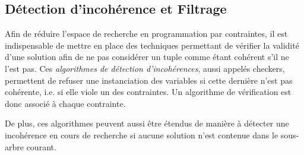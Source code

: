 \subsection{Détection d'incohérence et Filtrage}
\label{sec:PPC_propag}

Afin de réduire l'espace de recherche en programmation par contraintes,
il est indispensable de mettre en place des techniques permettant de
vérifier la validité d'une solution afin de ne pas considérer un tuple
comme étant cohérent s'il ne l'est pas. Ces {\it algorithmes de
détection d'incohérences}, aussi appelés checkers, permettent de
refuser une instanciation des variables si cette dernière n'est pas
cohérente, i.e. si elle viole un des contraintes. Un algorithme de
vérification est donc associé à chaque contrainte.

De plus, ces algorithmes peuvent aussi être étendus de manière à
détecter une incohérence en cours de recherche si aucune solution
n'est contenue dans le sous-arbre courant.
